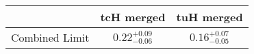 \centering
\begin{tabular}{|c|c|c|} \hline
 & tcH merged & tuH merged\\\hline
Combined Limit & $0.22^{+0.09}_{-0.06}$ & $0.16^{+0.07}_{-0.05}$\\\hline
\end{tabular}
